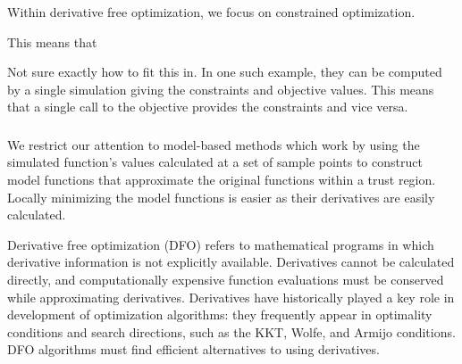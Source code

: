 Within derivative free optimization, we focus on constrained optimization.


This means that 



Not sure exactly how to fit this in.
\color{red}
In one such example, they can be computed by a single simulation giving the constraints and objective values.
This means that a single call to the objective provides the constraints and vice versa.
\color{black}


\subsubsection{}

We restrict our attention to model-based methods which work by using the simulated function's values calculated at a set of sample points to construct model
functions that approximate the original functions within a trust region.
Locally minimizing the model functions is easier as their derivatives are easily calculated.






  

Derivative free optimization (DFO) refers to mathematical programs in which derivative information is not explicitly available.
Derivatives cannot be calculated directly, and computationally expensive function evaluations must be conserved while approximating derivatives.
Derivatives have historically played a key role in development of optimization algorithms:
they frequently appear in optimality conditions and search directions, such as the KKT, Wolfe, and Armijo conditions.
DFO algorithms must find efficient alternatives to using derivatives.











